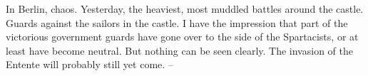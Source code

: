 In Berlin, chaos. Yesterday, the heaviest, most muddled battles around the castle. Guards against the sailors in the castle. I have the impression that part of the victorious government guards have gone over to the side of the Spartacists, or at least have become neutral. But nothing can be seen clearly. The invasion of the Entente will probably still yet come. --

